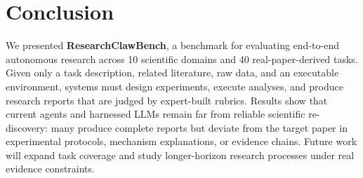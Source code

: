 \section{Conclusion}

We presented \textbf{ResearchClawBench}, a benchmark for evaluating end-to-end autonomous research across 10 scientific domains and 40 real-paper-derived tasks. Given only a task description, related literature, raw data, and an executable environment, systems must design experiments, execute analyses, and produce research reports that are judged by expert-built rubrics. Results show that current agents and harnessed LLMs remain far from reliable scientific re-discovery: many produce complete reports but deviate from the target paper in experimental protocols, mechanism explanations, or evidence chains. Future work will expand task coverage and study longer-horizon research processes under real evidence constraints.
